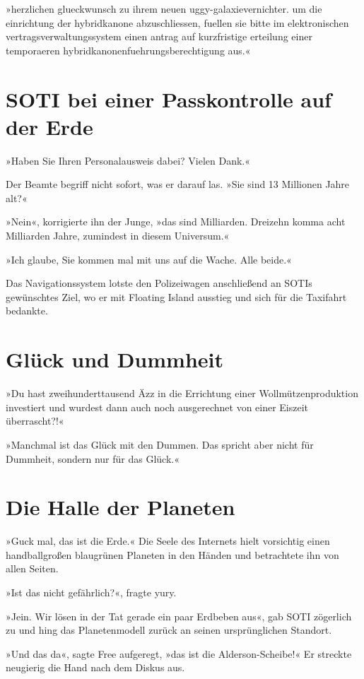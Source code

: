 »herzlichen glueckwunsch zu ihrem neuen uggy-galaxievernichter. um die einrichtung der hybridkanone abzuschliessen, fuellen sie bitte im elektronischen vertragsverwaltungssystem einen antrag auf kurzfristige erteilung einer temporaeren hybridkanonenfuehrungsberechtigung aus.«


\section{SOTI bei einer Passkontrolle auf der Erde}

»Haben Sie Ihren Personalausweis dabei? Vielen Dank.«

Der Beamte begriff nicht sofort, was er darauf las. »Sie sind 13 Millionen Jahre alt?«

»Nein«, korrigierte ihn der Junge, »das sind Milliarden. Dreizehn komma acht Milliarden Jahre, zumindest in diesem Universum.«

»Ich glaube, Sie kommen mal mit uns auf die Wache. Alle beide.«

Das Navigationssystem lotste den Polizeiwagen anschließend an SOTIs gewünschtes Ziel, wo er mit Floating Island ausstieg und sich für die Taxifahrt bedankte.


\section{Glück und Dummheit}

»Du hast zweihunderttausend Äzz in die Errichtung einer Wollmützenproduktion investiert und wurdest dann auch noch ausgerechnet von einer Eiszeit überrascht?!«

»Manchmal ist das Glück mit den Dummen. Das spricht aber nicht für Dummheit, sondern nur für das Glück.«


\section{Die Halle der Planeten}

»Guck mal, das ist die Erde.« Die Seele des Internets hielt vorsichtig einen handballgroßen blaugrünen Planeten in den Händen und betrachtete ihn von allen Seiten.

»Ist das nicht gefährlich?«, fragte yury.

»Jein. Wir lösen in der Tat gerade ein paar Erdbeben aus«, gab SOTI zögerlich zu und hing das Planetenmodell zurück an seinen ursprünglichen Standort.

»Und das da«, sagte Free aufgeregt, »das ist die Alderson-Scheibe!« Er streckte neugierig die Hand nach dem Diskus aus.

